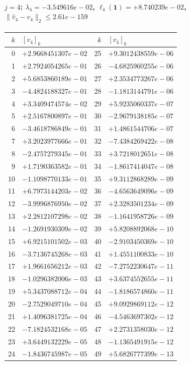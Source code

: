 \documentclass[11pt]{article}
\begin{document}
\paragraph{$j = 4$: $\lambda_{4} = -3.549616e-02$, \quad $\ell_{4}(\mathbf{1}) = +8.740239e-02$, \quad $\|\hat{v}_{4} - v_{4}\|_2 \leq 2.61e-159$}
\begin{center}
{\footnotesize
\begin{tabular}{r@{\;\;}l@{\quad}r@{\;\;}l}
\toprule
$k$ & $[v_{4}]_k$ & $k$ & $[v_{4}]_k$ \\
\midrule
0 & $+2.9668451307e-02$ & 25 & $+9.3012438559e-06$ \\
1 & $+2.7924054265e-01$ & 26 & $-4.6825960255e-06$ \\
2 & $+5.6853860189e-01$ & 27 & $+2.3534773267e-06$ \\
3 & $-4.4824188327e-01$ & 28 & $-1.1813144791e-06$ \\
4 & $+3.3409474574e-02$ & 29 & $+5.9235060337e-07$ \\
5 & $+2.5167800897e-01$ & 30 & $-2.9679138185e-07$ \\
6 & $-3.4618786849e-01$ & 31 & $+1.4861544706e-07$ \\
7 & $+3.2023977666e-01$ & 32 & $-7.4384269422e-08$ \\
8 & $-2.4757279345e-01$ & 33 & $+3.7218012651e-08$ \\
9 & $+1.7190363582e-01$ & 34 & $-1.8617414047e-08$ \\
10 & $-1.1098770133e-01$ & 35 & $+9.3112868289e-09$ \\
11 & $+6.7973144203e-02$ & 36 & $-4.6563649096e-09$ \\
12 & $-3.9996876950e-02$ & 37 & $+2.3283501234e-09$ \\
13 & $+2.2812107298e-02$ & 38 & $-1.1641958726e-09$ \\
14 & $-1.2691930309e-02$ & 39 & $+5.8208892068e-10$ \\
15 & $+6.9215101502e-03$ & 40 & $-2.9103450369e-10$ \\
16 & $-3.7136745268e-03$ & 41 & $+1.4551100833e-10$ \\
17 & $+1.9661656212e-03$ & 42 & $-7.2752230647e-11$ \\
18 & $-1.0296382006e-03$ & 43 & $+3.6374552655e-11$ \\
19 & $+5.3437088712e-04$ & 44 & $-1.8186574860e-11$ \\
20 & $-2.7529049710e-04$ & 45 & $+9.0929869112e-12$ \\
21 & $+1.4096381725e-04$ & 46 & $-4.5463697302e-12$ \\
22 & $-7.1824532168e-05$ & 47 & $+2.2731358030e-12$ \\
23 & $+3.6449132229e-05$ & 48 & $-1.1365491915e-12$ \\
24 & $-1.8436745987e-05$ & 49 & $+5.6826777399e-13$ \\
\bottomrule
\end{tabular}
}
\end{center}
\end{document}
